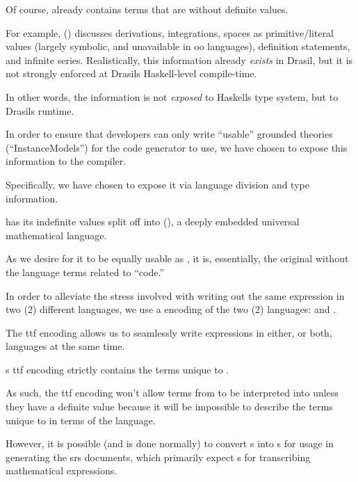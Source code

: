 Of course, \Expr{} already contains terms that are without definite values.

For example, \Expr{} () discusses derivations,
integrations, spaces as primitive/literal values (largely symbolic, and
unavailable in \acs{oo} languages), definition statements, and infinite series.
Realistically, this information already \textit{exists} in Drasil, but it is not
strongly enforced at Drasils Haskell-level compile-time.

In other words, the information is not \textit{exposed} to Haskells type system,
but to Drasils runtime.




In order to ensure that developers can only write ``usable'' grounded theories
(``InstanceModels'') for the code generator to use, we have chosen to expose
this information to the compiler.

Specifically, we have chosen to expose it via language division and type
information.

\languageDivision{}

\Expr{} has its indefinite values split off into \ModelExpr{}
(), a deeply embedded universal mathematical
language.

As we desire for it to be equally usable as \Expr{}, it is, essentially, the
original \Expr{} without the language terms related to ``code.''

In order to alleviate the stress involved with writing out the same expression
in two (2) different languages, we use a  encoding of the two (2)
languages:  and . 

The \acs{ttf} encoding allows us to seamlessly write expressions in either, or
both, languages at the same time. 

\ModelExpr{}s \acs{ttf} encoding strictly contains the terms unique to
\ModelExpr{}.

As such, the \acs{ttf} encoding won't allow terms from \ModelExpr{} to be
interpreted into \Expr{} unless they have a definite value because it will be
impossible to describe the terms unique to \ModelExpr{} in terms of the \Expr{}
language.

However, it is possible (and is done normally) to convert \Expr{}s into
\ModelExpr{}s for usage in generating the \acs{srs} documents, which primarily
expect \ModelExpr{}s for transcribing mathematical expressions.

